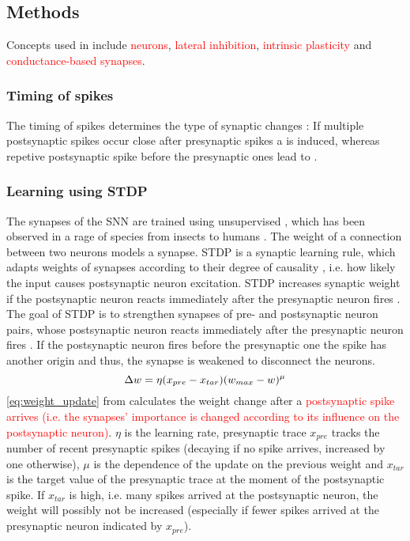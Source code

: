 \subsection{Methods}
\label{subsec:methods}

Concepts used in \cite{SNN} include \textcolor{red}{ neurons}, \textcolor{red}{lateral inhibition}, \textcolor{red}{intrinsic plasticity} and \textcolor{red}{conductance-based synapses}.

\subsubsection{Timing of spikes}
The timing of spikes determines the type of synaptic changes \cite{LTP_D_bio}:
If multiple postsynaptic spikes occur close after presynaptic spikes a  is induced, 
whereas repetive postsynaptic spike before the presynaptic ones lead to .


\subsubsection{Learning using \ac{STDP}}
The synapses of the \ac{SNN} are trained using unsupervised , which has been observed in a rage of species from insects to humans \cite{STDP_hebbian}. 
The weight of a connection between two neurons models a synapse.
\ac{STDP} is a synaptic learning rule, which adapts weights of synapses according to their degree of causality \cite{STDP_like},
 i.e. how likely the input causes postsynaptic neuron excitation.
\ac{STDP} increases synaptic weight if the postsynaptic neuron reacts immediately after the presynaptic neuron fires \cite{object_detection_SNN}.
The goal of \ac{STDP} is to strengthen synapses of pre- and postsynaptic neuron pairs, 
whose postsynaptic neuron reacts immediately after the presynaptic neuron fires \cite{object_detection_SNN}.
If the postsynaptic neuron fires before the presynaptic one the spike has another origin and thus, the synapse is weakened to disconnect the neurons.
%
\begin{equation}
    \centering
    \label{eq:weight_update}
    \Delta w = \eta (x_{pre} - x_{tar})(w_{max}-w)^\mu
\end{equation}
%
\autoref{eq:weight_update} from \cite{SNN} calculates the weight change after a \textcolor{red}{postsynaptic spike arrives 
(i.e. the synapses' importance is changed according to its influence on the postsynaptic neuron)}.
$\eta$ is the learning rate, presynaptic trace $x_{pre}$ tracks the number of recent presynaptic spikes 
(decaying if no spike arrives, increased by one otherwise), 
$\mu$ is the dependence of the update on the previous weight and 
$x_{tar}$ is the target value of the presynaptic trace at the moment of the postsynaptic spike.
If $x_{tar}$ is high, i.e. many spikes arrived at the postsynaptic neuron, the weight will possibly not be increased 
(especially if fewer spikes arrived at the presynaptic neuron indicated by  $x_{pre}$).

